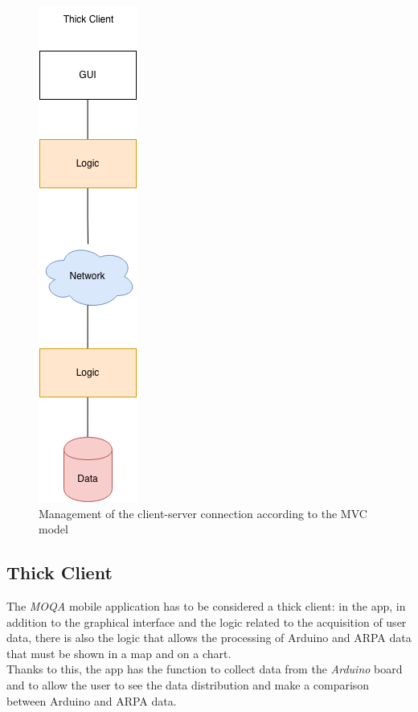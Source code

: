 \begin{figure}
  \begin{center}
    \includegraphics[height=.3\textheight]{./img/archi/mvc.png}
  \end{center}
  \caption{Management of the client-server connection according to the MVC model}
  \label{img:archi_mvc}
\end{figure}


\subsection{Thick Client}
The \textit{MOQA} mobile application has to be considered a thick client: in the app, in addition to the graphical interface and the logic related to the acquisition of user data, there is also the logic that allows the processing of Arduino and ARPA data that must be shown in a map and on a chart.\\
Thanks to this, the app has the function to collect data from the \textit{Arduino} board and to allow the user to see the data distribution and make a comparison between Arduino and ARPA data.

